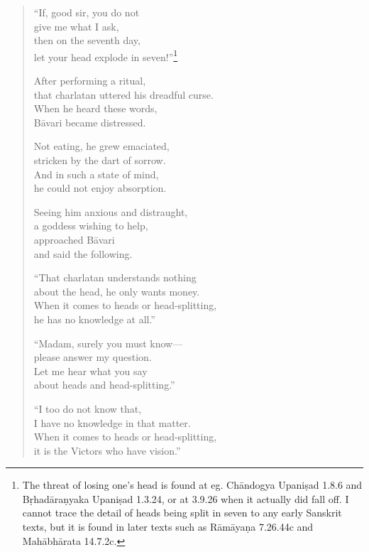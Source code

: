 \documentclass[12pt,openany]{book}%
\begin{document}
\begin{verse}
“If, good sir, you do not \\
give me what I ask, \\
then on the seventh day, \\
let your head explode in seven!”\footnote{The threat of losing one’s head is found at eg. \textsanskrit{Chāndogya} \textsanskrit{Upaniṣad} 1.8.6 and \textsanskrit{Bṛhadāraṇyaka} \textsanskrit{Upaniṣad} 1.3.24, or at 3.9.26 when it actually did fall off. I cannot trace the detail of heads being split in seven to any early Sanskrit texts, but it is found in later texts such as \textsanskrit{Rāmāyaṇa} 7.26.44c and \textsanskrit{Mahābhārata} 14.7.2c. } 

After performing a ritual, \\
that charlatan uttered his dreadful curse. \\
When he heard these words, \\
\textsanskrit{Bāvari} became distressed. 

Not eating, he grew emaciated, \\
stricken by the dart of sorrow. \\
And in such a state of mind, \\
he could not enjoy absorption. 

Seeing him anxious and distraught, \\
a goddess wishing to help, \\
approached \textsanskrit{Bāvari} \\
and said the following. 

“That charlatan understands nothing \\
about the head, he only wants money. \\
When it comes to heads or head-splitting, \\
he has no knowledge at all.” 

“Madam, surely you must know—\\
please answer my question. \\
Let me hear what you say \\
about heads and head-splitting.” 

“I too do not know that, \\
I have no knowledge in that matter. \\
When it comes to heads or head-splitting, \\
it is the Victors who have vision.” 


\end{verse}
\end{document}
